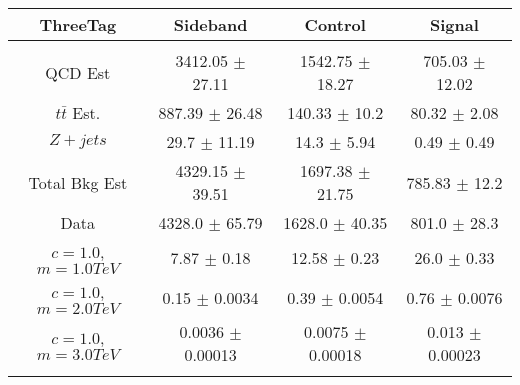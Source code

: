 \begin{footnotesize} 
\begin{tabular}{c|c|c|c} 
ThreeTag & Sideband & Control & Signal \\ 
\hline\hline 
& & & \\ 
QCD Est & 3412.05 $\pm$ 27.11 & 1542.75 $\pm$ 18.27 & 705.03 $\pm$ 12.02\\ 
$t\bar{t}$ Est.  & 887.39 $\pm$ 26.48 & 140.33 $\pm$ 10.2 & 80.32 $\pm$ 2.08\\ 
$Z+jets$ & 29.7 $\pm$ 11.19 & 14.3 $\pm$ 5.94 & 0.49 $\pm$ 0.49\\ 
Total Bkg Est & 4329.15 $\pm$ 39.51 & 1697.38 $\pm$ 21.75 & 785.83 $\pm$ 12.2\\ 
Data & 4328.0 $\pm$ 65.79 & 1628.0 $\pm$ 40.35 & 801.0 $\pm$ 28.3\\ 
$c=1.0$,$m=1.0TeV$ & 7.87 $\pm$ 0.18 & 12.58 $\pm$ 0.23 & 26.0 $\pm$ 0.33\\ 
$c=1.0$,$m=2.0TeV$ & 0.15 $\pm$ 0.0034 & 0.39 $\pm$ 0.0054 & 0.76 $\pm$ 0.0076\\ 
$c=1.0$,$m=3.0TeV$ & 0.0036 $\pm$ 0.00013 & 0.0075 $\pm$ 0.00018 & 0.013 $\pm$ 0.00023\\ 
& & & \\ 
\hline\hline 
\end{tabular} 
\end{footnotesize} 
\newline 
